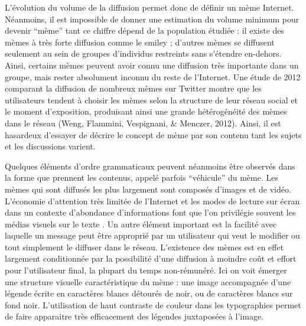 L{\textquoteright}évolution du volume de la diffusion permet donc de définir un mème Internet. Néanmoins, il est impossible de donner une estimation du volume minimum pour devenir {\textquotedblleft}mème{\textquotedblright} tant ce chiffre dépend de la population étudiée : il existe des mèmes à très forte diffusion comme le smiley ; d{\textquoteright}autres mèmes se diffusent seulement au sein de groupes d{\textquoteright}individus restreints sans s{\textquoteright}étendre en-dehors. Ainsi, certains mèmes peuvent avoir connu une diffusion très importante dans un groupe, mais rester absolument inconnu du reste de l{\textquoteright}Internet. Une étude de 2012 comparant la diffusion de nombreux mèmes sur Twitter montre que les utilisateurs tendent à choisir les mèmes selon la structure de leur réseau social et le moment d{\textquoteright}exposition, produisant ainsi une grande hétérogénéité des mèmes dans le réseau (Weng, Flammini, Vespignani, \& Menczer, 2012). Ainsi, il est hasardeux d{\textquoteright}essayer de décrire le concept de mème par son contenu tant les sujets et les discussions varient. 

Quelques éléments d{\textquoteright}ordre grammaticaux peuvent néanmoins être observés dans la forme que prennent les contenus, appelé parfois {\textquotedblleft}véhicule{\textquotedblright} du mème. Les mèmes qui sont diffusés les plus largement sont composés d{\textquoteright}images et de vidéo. L{\textquoteright}économie d{\textquoteright}attention très limitée de l{\textquoteright}Internet et les modes de lecture sur écran dans un contexte d{\textquoteright}abondance d{\textquoteright}informations font que l{\textquoteright}on privilégie souvent les médias visuels sur le texte \citep{Goldhaber2006}. Un autre élément important est la facilité avec laquelle un message peut être approprié par un utilisateur qui veut le modifier ou tout simplement le diffuser dans le réseau. L{\textquoteright}existence des mèmes est en effet largement conditionnée par la possibilité d{\textquoteright}une diffusion à moindre co\^ut et effort pour l{\textquoteright}utilisateur final, la plupart du temps non-rémunéré. Ici on voit émerger une structure visuelle caractéristique du mème : une image accompagnée d{\textquoteright}une légende écrite en caractères blancs détourés de noir, ou de caractères blancs sur fond noir. L{\textquoteright}utilisation de haut contraste de couleur dans les typographies permet de faire apparaitre très efficacement des légendes juxtaposées à l{\textquoteright}image.


